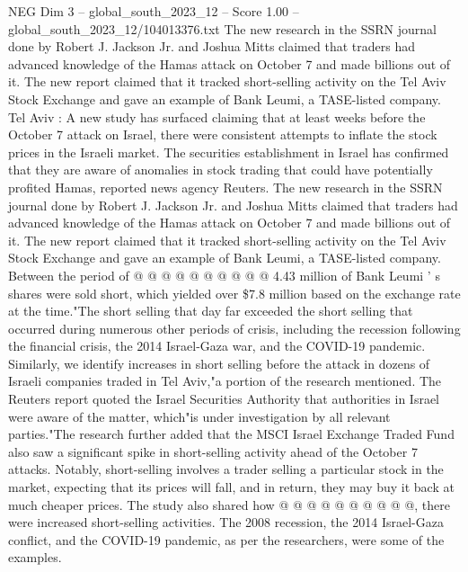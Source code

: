 \begin{textsample}{NEG Dim 3 – global\_south\_2023\_12 – Score 1.00 – global\_south\_2023\_12/104013376.txt}  \label{ex:f3_neg_016}
The new research in the SSRN journal done by Robert J.
Jackson Jr. and Joshua Mitts claimed that traders had advanced knowledge of the Hamas attack on October 7 and made billions out of it.
The new report claimed that it tracked short-selling activity on the Tel Aviv Stock Exchange and gave an example of Bank Leumi, a TASE-listed company.
Tel Aviv : A new study has surfaced claiming that at least weeks before the October 7 attack on Israel, there were consistent attempts to inflate the stock prices in the Israeli market.
The securities establishment in Israel has confirmed that they are aware of anomalies in stock trading that could have potentially profited Hamas, reported news agency Reuters.
The new research in the SSRN journal done by Robert J.
Jackson Jr. and Joshua Mitts claimed that traders had advanced knowledge of the Hamas attack on October 7 and made billions out of it.
The new report claimed that it tracked short-selling activity on the Tel Aviv Stock Exchange and gave an example of Bank Leumi, a TASE-listed company.
Between the period of @ @ @ @ @ @ @ @ @ @ 4.43 million of Bank Leumi ' s shares were sold short, which yielded over \$7.8 million based on the exchange rate at the time."The short selling that day far exceeded the short selling that occurred during numerous other periods of crisis, including the recession following the financial crisis, the 2014 Israel-Gaza war, and the COVID-19 pandemic.
Similarly, we identify increases in short selling before the attack in dozens of Israeli companies traded in Tel Aviv,"a portion of the research mentioned.
The Reuters report quoted the Israel Securities Authority that authorities in Israel were aware of the matter, which"is under investigation by all relevant parties."The research further added that the MSCI Israel Exchange Traded Fund also saw a significant spike in short-selling activity ahead of the October 7 attacks.
Notably, short-selling involves a trader selling a particular stock in the market, expecting that its prices will fall, and in return, they may buy it back at much cheaper prices.
The study also shared how @ @ @ @ @ @ @ @ @ @, there were increased short-selling activities.
The 2008 recession, the 2014 Israel-Gaza conflict, and the COVID-19 pandemic, as per the researchers, were some of the examples.

\end{textsample}
